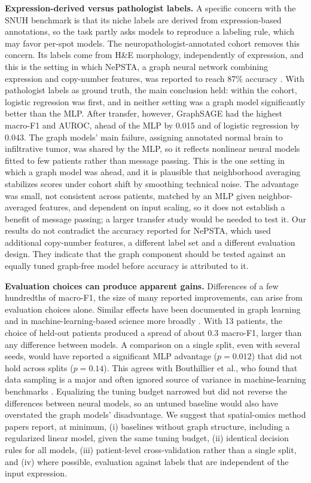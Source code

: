 \documentclass[11pt,letterpaper]{article}
\begin{document}
\textbf{Expression-derived versus pathologist labels.} A specific concern with the SNUH benchmark is that its niche labels are derived from expression-based annotations, so the task partly asks models to reproduce a labeling rule, which may favor per-spot models. The neuropathologist-annotated cohort removes this concern. Its labels come from H\&E morphology, independently of expression, and this is the setting in which NePSTA, a graph neural network combining expression and copy-number features, was reported to reach 87\% accuracy \cite{ritter2025}. With pathologist labels as ground truth, the main conclusion held: within the cohort, logistic regression was first, and in neither setting was a graph model significantly better than the MLP. After transfer, however, GraphSAGE had the highest macro-F1 and AUROC, ahead of the MLP by 0.015 and of logistic regression by 0.043. The graph models' main failure, assigning annotated normal brain to infiltrative tumor, was shared by the MLP, so it reflects nonlinear neural models fitted to few patients rather than message passing. This is the one setting in which a graph model was ahead, and it is plausible that neighborhood averaging stabilizes scores under cohort shift by smoothing technical noise. The advantage was small, not consistent across patients, matched by an MLP given neighbor-averaged features, and dependent on input scaling, so it does not establish a benefit of message passing; a larger transfer study would be needed to test it. Our results do not contradict the accuracy reported for NePSTA, which used additional copy-number features, a different label set and a different evaluation design. They indicate that the graph component should be tested against an equally tuned graph-free model before accuracy is attributed to it.

\textbf{Evaluation choices can produce apparent gains.} Differences of a few hundredths of macro-F1, the size of many reported improvements, can arise from evaluation choices alone. Similar effects have been documented in graph learning \cite{shchur2018,errica2020} and in machine-learning-based science more broadly \cite{kapoor2023,varoquaux2022}. With 13 patients, the choice of held-out patients produced a spread of about 0.3 macro-F1, larger than any difference between models. A comparison on a single split, even with several seeds, would have reported a significant MLP advantage ($p = 0.012$) that did not hold across splits ($p = 0.14$). This agrees with Bouthillier et al., who found that data sampling is a major and often ignored source of variance in machine-learning benchmarks \cite{bouthillier2021}. Equalizing the tuning budget narrowed but did not reverse the differences between neural models, so an untuned baseline would also have overstated the graph models' disadvantage. We suggest that spatial-omics method papers report, at minimum, (i) baselines without graph structure, including a regularized linear model, given the same tuning budget, (ii) identical decision rules for all models, (iii) patient-level cross-validation rather than a single split, and (iv) where possible, evaluation against labels that are independent of the input expression.
\end{document}
